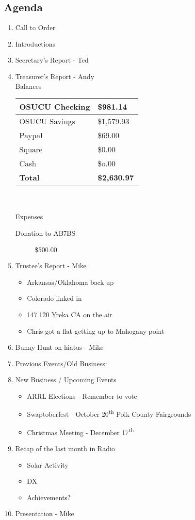 \documentclass[letter,11pt]{extarticle}
\begin{document}
	\subsection*{Agenda}
	\begin{enumerate}
		\item Call to Order
		\item Introductions
		\item Secretary's Report - Ted
		\item Treasurer's Report - Andy \\
				Balances 
			\begin{tabular}{|l|l|} \hline
				OSUCU Checking & \$981.14 \\ \hline
				OSUCU Savings & \$1,579.93 \\ \hline
				Paypal & \$69.00 \\ \hline
				Square & \$0.00 \\ \hline
				Cash & \$o.00 \\ \hline
				\textbf{Total} & \textbf{\$2,630.97} \\ \hline
			\end{tabular} \\ \\
			Expenses
			\begin{description}
				\item[Donation to AB7BS] \$500.00
			\end{description}
		\item Trustee's Report - Mike
			\begin{itemize}
				\item Arkansas/Oklahoma back up
				\item Colorado linked in
				\item 147.120 Yreka CA on the air
				\item Chris got a flat getting up to Mahogany point
			\end{itemize}
		\item Bunny Hunt on hiatus - Mike
		\item Previous Events/Old Business:
				
		\item  New Business / Upcoming Events
			\begin{itemize}
				\item ARRL Elections - Remember to vote
				\item Swaptoberfest - October 20\textsuperscript{th} Polk County Fairgrounds
				\item  Christmas Meeting - December 17\textsuperscript{th}
			\end{itemize}
		\item Recap of the last month in Radio
			\begin{itemize}
				\item Solar Activity
				\item DX
				\item Achievements?
			\end{itemize}
		\item  Presentation - Mike
	\end{enumerate}
\end{document}
